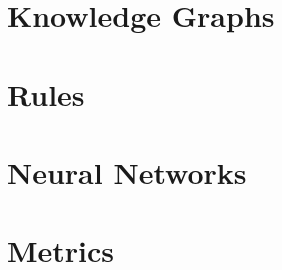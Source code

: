 \section{Knowledge Graphs}
\label{sec:2_basics/1_knowledge_graphs}



\section{Rules}
\label{sec:2_basics/2_rules}



\section{Neural Networks}
\label{sec:2_basics/3_neural_networks}



\section{Metrics}
\label{sec:2_basics/4_metrics}

